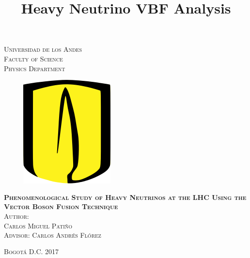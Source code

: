 \documentclass[11pt, oneside]{book}
\begin{document}

\title{Heavy Neutrino VBF Analysis} %

\begin{titlepage}
\begin{center}

\textsc{\Large Universidad de los Andes}\\[3em]

\textsc{\large Faculty of Science}\\[1em]

\textsc{\large Physics Department} \\[1em]

\begin{figure}[H]
\begin{center}
\includegraphics[scale = 0.4]{logo-uniandes.png}
\end{center}
\end{figure}

\vspace{0.5em}

\textsc{\huge \textbf{Phenomenological Study of Heavy Neutrinos at the LHC Using the Vector Boson Fusion Technique}}\\[4em]

\textsc{Author:}\\[1em]

\textsc{\Large Carlos Miguel Patiño}\\[1em]

\textsc{\large Advisor: Carlos Andrés Flórez}

\end{center}

\vspace*{\fill}
\textsc{Bogotá D.C. \hspace*{\fill} 2017}

\end{titlepage}
\end{document}
